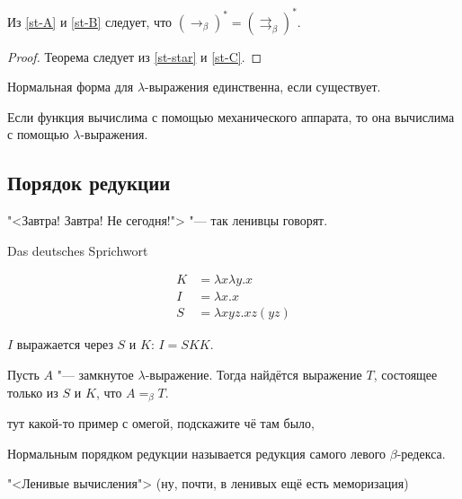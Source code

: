 \begin{statement} \label{st-C}
    Из \ref{st-A} и \ref{st-B} следует, что $(\rightarrow_{\beta})^{*} = (\rightrightarrows_{\beta})^{*}$.
\end{statement}

\begin{proof}
    Теорема  следует из \ref{st-star} и \ref{st-C}.
\end{proof}

\begin{corollary}
    Нормальная форма для $\lambda$-выражения единственна, если существует.
\end{corollary}

\begin{theorem}
    Если функция вычислима с помощью механического аппарата, то она вычислима с помощью $\lambda$-выражения.
\end{theorem}

\subsection{\texorpdfstring{Порядок редукции}{Order of reduction}}
\epigraph{"<Завтра! Завтра! Не сегодня!"> "--- так ленивцы говорят.}{Das deutsches Sprichwort}

\begin{definition}
    \begin{align*}
        K &= \lambda x \lambda y . x \\
        I &= \lambda x . x \\
        S &= \lambda x y z . x z (y z)
    \end{align*}
\end{definition}
$I$ выражается через $S$ и $K$: $I = S K K$.

\begin{statement} \label{SK-basis}
    Пусть $A$ "--- замкнутое $\lambda$-выражение. Тогда найдётся выражение $T$, состоящее только из $S$ и $K$, что $A =_{\beta}T$.
\end{statement}

\begin{example}
    тут какой-то пример с омегой, подскажите чё там было, \todo %
\end{example}

\begin{definition}
    Нормальным порядком редукции называется редукция самого левого $\beta$-редекса.
\end{definition}
"<Ленивые вычисления"> (ну, почти, в ленивых ещё есть меморизация)

